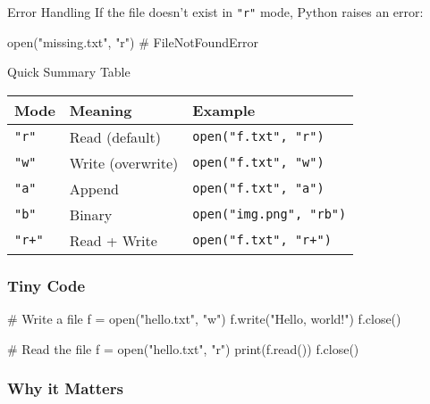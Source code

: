 \documentclass[
  letterpaper,
  DIV=11,
  numbers=noendperiod]{scrreprt}
\newenvironment{Shaded}{\begin{snugshade}}{\end{snugshade}}
\newcommand{\BuiltInTok}[1]{\textcolor[rgb]{0.00,0.23,0.31}{#1}}
\newcommand{\CommentTok}[1]{\textcolor[rgb]{0.37,0.37,0.37}{#1}}
\newcommand{\NormalTok}[1]{\textcolor[rgb]{0.00,0.23,0.31}{#1}}
\newcommand{\OperatorTok}[1]{\textcolor[rgb]{0.37,0.37,0.37}{#1}}
\newcommand{\StringTok}[1]{\textcolor[rgb]{0.13,0.47,0.30}{#1}}
\begin{document}
Error Handling If the file doesn't exist in \texttt{"r"} mode, Python
raises an error:

\begin{Shaded}
\begin{Highlighting}[]
\BuiltInTok{open}\NormalTok{(}\StringTok{"missing.txt"}\NormalTok{, }\StringTok{"r"}\NormalTok{)  }\CommentTok{\# FileNotFoundError}
\end{Highlighting}
\end{Shaded}

Quick Summary Table

\begin{longtable}[]{@{}lll@{}}
\toprule\noalign{}
Mode & Meaning & Example \\
\midrule\noalign{}
\endhead
\bottomrule\noalign{}
\endlastfoot
\texttt{"r"} & Read (default) & \texttt{open("f.txt",\ "r")} \\
\texttt{"w"} & Write (overwrite) & \texttt{open("f.txt",\ "w")} \\
\texttt{"a"} & Append & \texttt{open("f.txt",\ "a")} \\
\texttt{"b"} & Binary & \texttt{open("img.png",\ "rb")} \\
\texttt{"r+"} & Read + Write & \texttt{open("f.txt",\ "r+")} \\
\end{longtable}

\subsubsection{Tiny Code}\label{tiny-code-50}

\begin{Shaded}
\begin{Highlighting}[]
\CommentTok{\# Write a file}
\NormalTok{f }\OperatorTok{=} \BuiltInTok{open}\NormalTok{(}\StringTok{"hello.txt"}\NormalTok{, }\StringTok{"w"}\NormalTok{)}
\NormalTok{f.write(}\StringTok{"Hello, world!"}\NormalTok{)}
\NormalTok{f.close()}

\CommentTok{\# Read the file}
\NormalTok{f }\OperatorTok{=} \BuiltInTok{open}\NormalTok{(}\StringTok{"hello.txt"}\NormalTok{, }\StringTok{"r"}\NormalTok{)}
\BuiltInTok{print}\NormalTok{(f.read())}
\NormalTok{f.close()}
\end{Highlighting}
\end{Shaded}

\subsubsection{Why it Matters}\label{why-it-matters-50}
\end{document}

